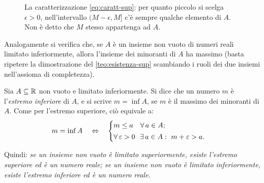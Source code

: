 \begin{figure}[htb]
\centering
{}
\caption{La caratterizzazione \eqref{eq:caratt-sup}: per quanto piccolo si scelga
$\epsilon>0$, nell'intervallo $(M-\epsilon,M]$ c'è sempre qualche elemento di $A$. Non
è detto che $M$ stesso appartenga ad $A$.}
\label{fig:caratt-sup}
\end{figure}

Analogamente si verifica che, se $A$ è un insieme non vuoto di numeri reali limitato
inferiormente, allora l'insieme dei minoranti di $A$ ha massimo (basta ripetere la
dimostrazione del \cref{teo:esistenza-sup} scambiando i ruoli dei due insiemi
nell'assioma di completezza).

\begin{definizione}
Sia $A\subseteq\mathbb{R}$ non vuoto e limitato inferiormente. Si dice che un numero $m$ è
l'\emph{estremo inferiore} di $A$, e si scrive $m=\inf A$, se $m$ è il massimo dei
minoranti di $A$. Come per l'estremo superiore, ciò equivale a:
\begin{equation}\label{eq:caratt-inf}
  m=\inf A \quad\Leftrightarrow\quad
  \begin{cases}
    m\le a \quad \forall\, a\in A;\\[2pt]
    \forall\,\varepsilon>0\ \ \exists\, a\in A : \ m+\varepsilon>a.
  \end{cases}
\end{equation}
\end{definizione}

Quindi: \emph{se un insieme non vuoto è limitato superiormente, esiste l'estremo
superiore ed è un numero reale; se un insieme non vuoto è limitato inferiormente,
esiste l'estremo inferiore ed è un numero reale.}


